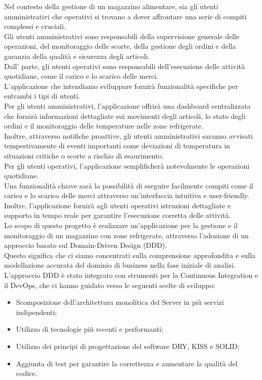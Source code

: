 Nel contesto della gestione di un magazzino alimentare, sia gli utenti amministrativi che operativi si trovano a dover
affrontare una serie di compiti complessi e cruciali.\\ Gli utenti amministrativi sono responsabili della supervisione
generale delle operazioni, del monitoraggio delle scorte, della gestione degli ordini e della garanzia della qualità e
sicurezza degli articoli.\\ Dall' parte, gli utenti operativi sono responsabili dell'esecuzione delle attività
quotidiane, come il carico e lo scarico delle merci.\\
L'applicazione che intendiamo sviluppare fornirà funzionalità specifiche per entrambi i tipi di utenti.\\
Per gli utenti amministrativi, l'applicazione offrirà una dashboard centralizzata che fornirà informazioni dettagliate
sui movimenti degli articoli, lo stato degli ordini e il monitoraggio delle temperature nelle zone refrigerate.\\
Inoltre, attraverso notifiche proattive, gli utenti amministrativi saranno avvisati tempestivamente di eventi importanti
come deviazioni di temperatura in situazioni critiche o scorte a rischio di esaurimento.\\
Per gli utenti operativi, l'applicazione semplificherà notevolmente le operazioni quotidiane.\\
Una funzionalità chiave sarà la possibilità di eseguire facilmente compiti come il carico e lo scarico delle
merci attraverso un'interfaccia intuitiva e user-friendly.\\
Inoltre, l'applicazione fornirà agli utenti operativi istruzioni dettagliate e supporto in tempo reale per garantire l'esecuzione corretta delle attività.\\
Lo scopo di questo progetto è realizzare un'applicazione per la gestione e il monitoraggio di un magazzino con zone
refrigerate, attraverso l'adozione di un approccio basato sul Domain-Driven Design (DDD).\\
Questo significa che ci siamo concentrati sulla comprensione approfondita e sulla modellazione accurata del dominio di business nella fase iniziale di analisi.\\
L'approccio DDD è stato integrato con strumenti per la Continuous Integration e il DevOps, che ci hanno guidato verso le seguenti scelte di sviluppo:
\begin{itemize}
    \item Scomposizione dell’architettura monolitica del Server in più servizi indipendenti;
    \item Utilizzo di tecnologie più recenti e performanti;
    \item Utilizzo dei principi di progettazione del software DRY, KISS e SOLID;
    \item Aggiunta di test per garantire la correttezza e aumentare la qualità del codice.
\end{itemize}
\newpage

